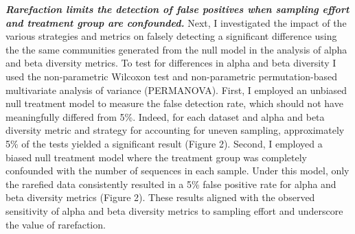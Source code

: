 \documentclass[
]{article}
\begin{document}
\textbf{\emph{Rarefaction limits the detection of false positives when
sampling effort and treatment group are confounded.}} Next, I
investigated the impact of the various strategies and metrics on falsely
detecting a significant difference using the the same communities
generated from the null model in the analysis of alpha and beta
diversity metrics. To test for differences in alpha and beta diversity I
used the non-parametric Wilcoxon test and non-parametric
permutation-based multivariate analysis of variance (PERMANOVA). First,
I employed an unbiased null treatment model to measure the false
detection rate, which should not have meaningfully differed from 5\%.
Indeed, for each dataset and alpha and beta diversity metric and
strategy for accounting for uneven sampling, approximately 5\% of the
tests yielded a significant result (Figure 2). Second, I employed a
biased null treatment model where the treatment group was completely
confounded with the number of sequences in each sample. Under this
model, only the rarefied data consistently resulted in a 5\% false
positive rate for alpha and beta diversity metrics (Figure 2). These
results aligned with the observed sensitivity of alpha and beta
diversity metrics to sampling effort and underscore the value of
rarefaction.
\end{document}

